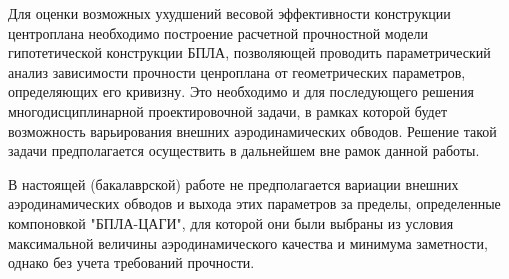  




Для оценки возможных ухудшений весовой эффективности конструкции центроплана необходимо построение расчетной прочностной модели гипотетической конструкции БПЛА, позволяющей проводить параметрический анализ зависимости прочности ценроплана от геометрических параметров, определяющих его кривизну. Это необходимо и для последующего решения многодисциплинарной проектировочной задачи, в рамках которой будет возможность варьирования внешних аэродинамических обводов. 
Решение такой задачи предполагается осуществить в дальнейшем вне рамок данной работы. 

В настоящей (бакалаврской) работе не предполагается вариации внешних аэродинамических обводов и выхода этих параметров за пределы, определенные компоновкой "БПЛА-ЦАГИ", для которой они были выбраны из условия максимальной величины аэродинамического качества и минимума заметности, однако без учета требований прочности. 





 
  
  

%

